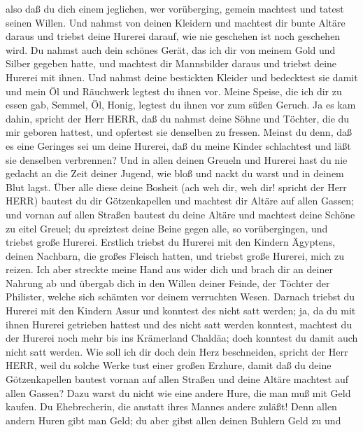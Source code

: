 also daß du dich einem jeglichen, wer vorüberging, gemein machtest und
tatest seinen Willen.  Und nahmst von deinen Kleidern und
machtest dir bunte Altäre daraus und triebst deine Hurerei darauf, wie
nie geschehen ist noch geschehen wird.  Du nahmst auch dein
schönes Gerät, das ich dir von meinem Gold und Silber gegeben hatte, und
machtest dir Mannsbilder daraus und triebst deine Hurerei mit ihnen.
 Und nahmst deine bestickten Kleider und bedecktest sie
damit und mein Öl und Räuchwerk legtest du ihnen vor. 
Meine Speise, die ich dir zu essen gab, Semmel, Öl, Honig, legtest du
ihnen vor zum süßen Geruch. Ja es kam dahin, spricht der Herr HERR,
 daß du nahmst deine Söhne und Töchter, die du mir geboren
hattest, und opfertest sie denselben zu fressen. Meinst du denn, daß es
eine Geringes sei um deine Hurerei,  daß du meine Kinder
schlachtest und läßt sie denselben verbrennen?  Und in
allen deinen Greueln und Hurerei hast du nie gedacht an die Zeit deiner
Jugend, wie bloß und nackt du warst und in deinem Blut lagst.
 Über alle diese deine Bosheit (ach weh dir, weh dir!
spricht der Herr HERR)  bautest du dir Götzenkapellen und
machtest dir Altäre auf allen Gassen;  und vornan auf allen
Straßen bautest du deine Altäre und machtest deine Schöne zu eitel
Greuel; du spreiztest deine Beine gegen alle, so vorübergingen, und
triebst große Hurerei.  Erstlich triebst du Hurerei mit den
Kindern Ägyptens, deinen Nachbarn, die großes Fleisch hatten, und
triebst große Hurerei, mich zu reizen.  Ich aber streckte
meine Hand aus wider dich und brach dir an deiner Nahrung ab und übergab
dich in den Willen deiner Feinde, der Töchter der Philister, welche sich
schämten vor deinem verruchten Wesen.  Darnach triebst du
Hurerei mit den Kindern Assur und konntest des nicht satt werden; ja, da
du mit ihnen Hurerei getrieben hattest und des nicht satt werden
konntest,  machtest du der Hurerei noch mehr bis ins
Krämerland Chaldäa; doch konntest du damit auch nicht satt werden.
 Wie soll ich dir doch dein Herz beschneiden, spricht der
Herr HERR, weil du solche Werke tust einer großen Erzhure, 
damit daß du deine Götzenkapellen bautest vornan auf allen Straßen und
deine Altäre machtest auf allen Gassen? Dazu warst du nicht wie eine
andere Hure, die man muß mit Geld kaufen.  Du Ehebrecherin,
die anstatt ihres Mannes andere zuläßt!  Denn allen andern
Huren gibt man Geld; du aber gibst allen deinen Buhlern Geld zu und
